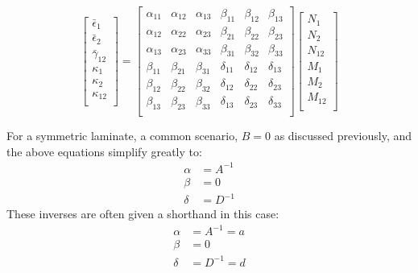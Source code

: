 \documentclass{article}
\begin{document}
\begin{equation}
\left[
\begin{matrix}
\bar\epsilon_{1}\\
\bar\epsilon_{2}\\
\bar\gamma_{12}\\
\kappa_1 \\
\kappa_2 \\
\kappa_{12} \\
\end{matrix}
\right]
=
\left[
\begin{matrix}
    \alpha_{11} & \alpha_{12} & \alpha_{13} & \beta_{11} & \beta_{12} & \beta_{13} \\
    \alpha_{12} & \alpha_{22} & \alpha_{23} & \beta_{21} & \beta_{22} & \beta_{23} \\
    \alpha_{13} & \alpha_{23} & \alpha_{33} & \beta_{31} & \beta_{32} & \beta_{33} \\
    \beta_{11} & \beta_{21} & \beta_{31} & \delta_{11} & \delta_{12} & \delta_{13} \\
    \beta_{12} & \beta_{22} & \beta_{32}  & \delta_{12} & \delta_{22} & \delta_{23} \\
    \beta_{13} & \beta_{23} & \beta_{33} & \delta_{13} & \delta_{23} & \delta_{33} \\
\end{matrix}
\right]
\left[
\begin{matrix}
N_{1}\\
N_{2}\\
N_{12}\\
M_{1}\\
M_{2}\\
M_{12}\\
\end{matrix}
\right]
\label{eq:ADBinverse}
\end{equation}


For a symmetric laminate, a common scenario, $B = 0$ as discussed previously, and the above equations simplify greatly to:
\begin{align}
\alpha &= A^{-1} \\
\beta &= 0 \\
\delta &= D^{-1}
\end{align}
These inverses are often given a shorthand in this case:
\begin{align}
\alpha &= A^{-1} = a\\
\beta &= 0 \\
\delta &= D^{-1} = d
\end{align}
\end{document}
